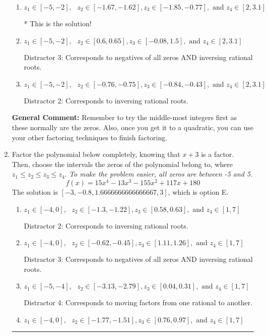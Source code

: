 \documentclass{extbook}[14pt]
\newcommand{\litem}[1]{\item #1

\rule{\textwidth}{0.4pt}}
\begin{document}
\begin{enumerate}
{\begin{enumerate}[label=\Alph*.]
 Distractor 4: Corresponds to moving factors from one rational to another.
\item \( z_1 \in [-5, -2], \text{   }  z_2 \in [-1.67, -1.62], z_3 \in [-1.85, -0.77], \text{   and   } z_4 \in [2, 3.1] \)

* This is the solution!
\item \( z_1 \in [-5, -2], \text{   }  z_2 \in [0.6, 0.65], z_3 \in [-0.08, 1.5], \text{   and   } z_4 \in [2, 3.1] \)

 Distractor 3: Corresponds to negatives of all zeros AND inversing rational roots.
\item \( z_1 \in [-5, -2], \text{   }  z_2 \in [-0.76, -0.75], z_3 \in [-0.84, -0.43], \text{   and   } z_4 \in [2, 3.1] \)

 Distractor 2: Corresponds to inversing rational roots.
\end{enumerate}

\textbf{General Comment:} Remember to try the middle-most integers first as these normally are the zeros. Also, once you get it to a quadratic, you can use your other factoring techniques to finish factoring.
}
\litem{
Factor the polynomial below completely, knowing that $x+3$ is a factor. Then, choose the intervals the zeros of the polynomial belong to, where $z_1 \leq z_2 \leq z_3 \leq z_4$. \textit{To make the problem easier, all zeros are between -5 and 5.}
\[ f(x) = 15x^{4} -13 x^{3} -155 x^{2} +117 x + 180 \]The solution is \( [-3, -0.8, 1.6666666666666667, 3] \), which is option E.\begin{enumerate}[label=\Alph*.]
\item \( z_1 \in [-4, 0], \text{   }  z_2 \in [-1.3, -1.22], z_3 \in [0.58, 0.63], \text{   and   } z_4 \in [1, 7] \)

 Distractor 2: Corresponds to inversing rational roots.
\item \( z_1 \in [-4, 0], \text{   }  z_2 \in [-0.62, -0.45], z_3 \in [1.11, 1.26], \text{   and   } z_4 \in [1, 7] \)

 Distractor 3: Corresponds to negatives of all zeros AND inversing rational roots.
\item \( z_1 \in [-5, -4], \text{   }  z_2 \in [-3.13, -2.79], z_3 \in [0.04, 0.31], \text{   and   } z_4 \in [1, 7] \)

 Distractor 4: Corresponds to moving factors from one rational to another.
\item \( z_1 \in [-4, 0], \text{   }  z_2 \in [-1.77, -1.51], z_3 \in [0.76, 0.97], \text{   and   } z_4 \in [1, 7] \)


\end{enumerate}}
\end{enumerate}
\end{document}
